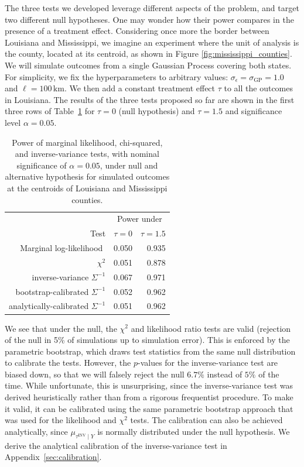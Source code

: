 \documentclass[letter]{article}
\newcommand{\sigmaf}{\sigma_{\mathrm{GP}}}
\newcommand{\sigman}{\sigma_{\epsilon}}
\newcommand{\invvar}{\tau^{\mathrm{INV}}}
\begin{document}
    	The three tests we developed leverage different aspects of the problem, and target two different null hypotheses. One may wonder how their power compares in the presence of a treatment effect. Considering once more the border between Louisiana and Mississippi, we imagine an experiment where the unit of analysis is the county, located at its centroid, as shown in Figure \ref{fig:mississippi_counties}.
We will simulate outcomes from a single Gaussian Process covering both states. For simplicity, we fix the hyperparameters to arbitrary values: \(\sigman=\sigmaf=1.0\) and \(\ell=100\,\mathrm{km}\).
We then add a constant treatment effect \(\tau\) to all the outcomes in Louisiana.
The results of the three tests proposed so far are shown in the first three rows of Table~\ref{table:power} for \(\tau=0\) (null hypothesis) and \(\tau=1.5\) and significance level \(\alpha=0.05\).
    

\begin{table}
    \caption{Power of marginal likelihood, chi-squared, and inverse-variance tests, with nominal significance of $\alpha=0.05$, under null and alternative hypothesis for simulated outcomes at the centroids of Louisiana and Mississippi counties.}
    \label{table:power}
    \centering
    \begin{tabular}{rrr}
        \toprule
        & \multicolumn{2}{c}{Power under} \\
        Test & $\tau=0$ & $\tau=1.5$ \\
        \midrule
        Marginal log-likelihood $ $ & 0.050 & 0.935 \\
        $\chi^2$ & 0.051 & 0.878 \\
        inverse-variance $\Sigma^{-1}$ & 0.067 & 0.971 \\
        bootstrap-calibrated $\Sigma^{-1}$ & 0.052 & 0.962 \\
        analytically-calibrated $\Sigma^{-1}$ & 0.051 & 0.962 \\
        \bottomrule
    \end{tabular}
\end{table}
    	We see that under the null, the \(\chi^2\) and likelihood ratio tests are valid (rejection of the null in 5\% of simulations up to simulation error).
This is enforced by the parametric bootstrap, which draws test statistics from the same null distribution to calibrate the tests.
However, the \(p\)-values for the inverse-variance test are biased down, so that we will falsely reject the null \(6.7\%\) instead of \(5\%\) of the time.
While unfortunate, this is unsurprising, since the inverse-variance test was derived heuristically rather than from a rigorous frequentist procedure.
To make it valid, it can be calibrated using the same parametric bootstrap approach that was used for the likelihood and \(\chi^2\) tests.
The calibration can also be achieved analytically, since \(\mu_{\invvar \mid Y}\) is normally distributed under the null hypothesis.
We derive the analytical calibration of the inverse-variance test in Appendix~\ref{sec:calibration}.
\end{document}
